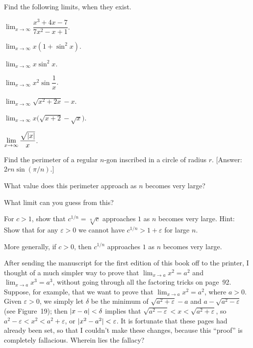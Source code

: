 Find the following limits, when they exist.
\begin{romans}
\item $\displaystyle\lim_{x\to\infty}\dfrac{x^3+4x-7}{7x^2-x+1}$.
\item $\displaystyle\lim_{x\to\infty}x(1+\sin^2 x)$.
\item $\displaystyle\lim_{x\to\infty}x\sin^2 x$.
\item $\displaystyle\lim_{x\to\infty}x^2\sin\dfrac{1}{x}$.
\item $\displaystyle\lim_{x\to\infty}\sqrt{x^2+2x}-x$.
\item $\displaystyle\lim_{x\to\infty}x\bigl(\sqrt{x+2}-\sqrt{x}\bigr)$.
\item $\displaystyle\lim_{x\to\infty}\dfrac{\sqrt{\lvert x\rvert}}{x}$.
\end{romans}

\begin{letters}
\item Find the perimeter of a regular $n$-gon inscribed in a circle of radius
$r$. [Answer: $2rn\sin(\pi/n)$.]
\item What value does this perimeter approach as $n$ becomes very large?
\item What limit can you guess from this?
\end{letters}

\begin{letters}
\item For $c>1$, show that $c^{1/n}=\sqrt[n]{c}$ approaches $1$ as $n$ becomes
very large. Hint: Show that for any $\varepsilon>0$ we cannot have
$c^{1/n}>1+\varepsilon$ for large $n$.
\item More generally, if $c>0$, then $c^{1/n}$ approaches $1$ as $n$ becomes
very large.
\end{letters}

After sending the manuscript for the first edition of this book off to the
printer, I thought of a much simpler way to prove that $\lim_{x\to a}x^2=a^2$
and $\lim_{x\to a}x^3=a^3$, without going through all the factoring tricks on
page~92. Suppose, for example, that we want to prove that
$\lim_{x\to a}x^2=a^2$, where $a>0$. Given $\varepsilon>0$, we simply let
$\delta$ be the minimum of $\sqrt{a^2+\varepsilon}-a$ and
$a-\sqrt{a^2-\varepsilon}$ (see Figure~19); then $\lvert x-a\rvert<\delta$ implies
that $\sqrt{a^2-\varepsilon}<x<\sqrt{a^2+\varepsilon}$, so
$a^2-\varepsilon<x^2<a^2+\varepsilon$, or $\lvert x^2-a^2\rvert<\varepsilon$. It is
fortunate that these pages had already been set, so that I couldn't make these
changes, because this ``proof'' is completely fallacious. Wherein lies the
fallacy?

\begin{center}
\\[0.6em]
\end{center}